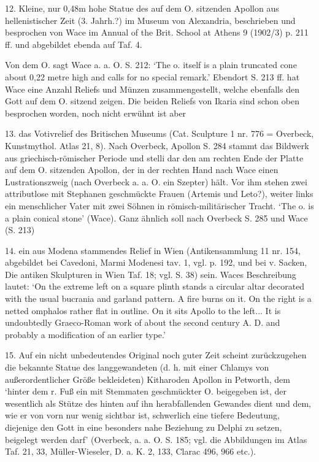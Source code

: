 \documentclass[a4paper, 11pt, oneside]{article}
\begin{document}
12. Kleine, nur 0,48m hohe Statue des auf dem O. sitzenden Apollon aus hellenistischer Zeit (3. Jahrh.?) im Museum von Alexandria, beschrieben und besprochen von Wace im Annual of the Brit. School at Athens 9 (1902/3) p. 211 ff. und abgebildet ebenda auf Taf. 4.

Von dem O. sagt Wace a. a. O. S. 212: `The o. itself is a plain truncated cone about 0,22 metre high and calls for no special remark.' Ebendort S. 213 ff. hat Wace eine Anzahl Reliefs und Münzen zusammengestellt, welche ebenfalls den Gott auf dem O. sitzend zeigen. Die beiden Reliefs von Ikaria sind schon oben besprochen worden, noch nicht erwühnt ist aber

13. das Votivrelief des Britischen Museums (Cat. Sculpture 1 nr. 776 = Overbeck, Kunstmythol. Atlas 21, 8). Nach Overbeck, Apollon S. 284 stammt das Bildwerk aus griechisch-römischer Periode und stelli dar den am rechten Ende der Platte auf dem O. sitzenden Apollon, der in der rechten Hand nach Wace einen Lustrationszweig (nach Overbeck a. a. O. ein Szepter) hält. Vor ihm stehen zwei attributlose mit Stephanen geschmückte Frauen (Artemis und Leto?), weiter links ein menschlicher Vater mit zwei Söhnen in römisch-militärischer Tracht. `The o. is a plain conical stone' (Wace). Ganz ähnlich soll nach Overbeck S. 285 und Wace (S. 213)

14. ein aus Modena stammendes Relief in Wien (Antikensammlung 11 nr. 154, abgebildet bei Cavedoni, Marmi Modenesi tav. 1, vgl. p. 192, und bei v. Sacken, Die antiken Skulpturen in Wien Taf. 18; vgl. S. 38) sein. Waces Beschreibung lautet: `On the extreme left on a square plinth stands a circular altar decorated with the usual bucrania and garland pattern. A fire burns on it. On the right is a netted omphalos rather flat in outline. On it sits Apollo to the left... It is undoubtedly Graeco-Roman work of about the second century A. D. and probably a modification of an earlier type.'

15. Auf ein nicht unbedeutendes Original noch guter Zeit scheint zurückzugehen die bekannte Statue des langgewandeten (d. h. mit einer Chlamys von außerordentlicher Größe bekleideten) Kitharoden Apollon in Petworth, dem `hinter dem r. Fuß ein mit Stemmaten geschmückter O. beigegeben ist, der wesentlich als Stütze des hinten auf ihn herabfallenden Gewandes dient und dem, wie er von vorn nur wenig sichtbar ist, schwerlich eine tiefere Bedeutung, diejenige den Gott in eine besonders nahe Beziehung zu Delphi zu setzen, beigelegt werden darf' (Overbeck, a. a. O. S. 185; vgl. die Abbildungen im Atlas Taf. 21, 33, Müller-Wieseler, D. a. K. 2, 133, Clarac 496, 966 etc.).
\end{document}
